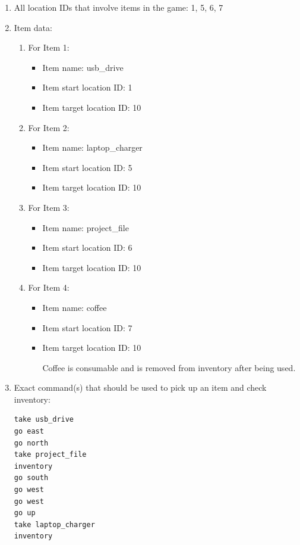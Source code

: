 \documentclass[11pt]{article}
\begin{document}
\begin{enumerate}
\item All location IDs that involve items in the game: 1, 5, 6, 7

\item Item data:
\begin{enumerate}
    \item For Item 1:
    \begin{itemize}
    \item Item name: usb\_drive
    \item Item start location ID: 1
    \item Item target location ID: 10
    \end{itemize}
    \item For Item 2:
    \begin{itemize}
    \item Item name: laptop\_charger
    \item Item start location ID: 5
    \item Item target location ID: 10
    \end{itemize}
    \item For Item 3:
    \begin{itemize}
    \item Item name: project\_file
    \item Item start location ID: 6
    \item Item target location ID: 10
    \end{itemize}
    \item For Item 4:
    \begin{itemize}
    \item Item name: coffee
    \item Item start location ID: 7
    \item Item target location ID: 10

    Coffee is consumable and is removed from inventory after being      used.
    \end{itemize}
\end{enumerate}

    \item Exact command(s) that should be used to pick up an item and check inventory:
    \begin{verbatim}
take usb_drive
go east
go north
take project_file
inventory
go south
go west
go west
go up
take laptop_charger
inventory
    \end{verbatim}
    

\end{enumerate}
\end{document}
